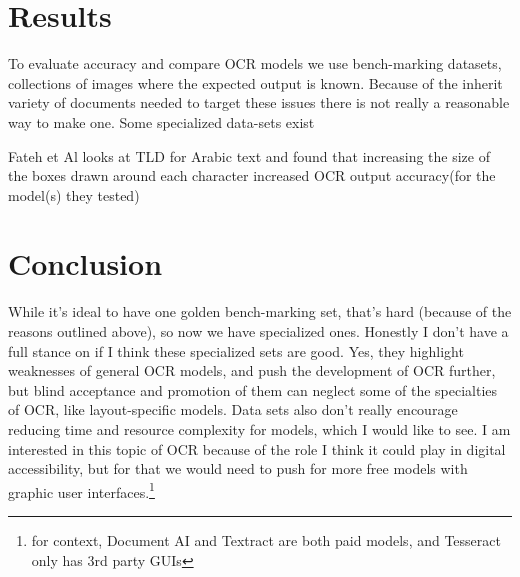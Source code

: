 \documentclass[sigplan,screen,nonacm]{acmart-tagged}
\begin{document}
\section{Results}
\label{sec:Results}

To evaluate accuracy and compare OCR models we use bench-marking datasets, collections of images where the expected output is known. Because of the inherit variety of documents needed to target these issues there is not really a reasonable way to make one. Some specialized data-sets exist \cite{Fateh:2024,Hegghamer:2022}

Fateh et Al\citep{Fateh:2024} looks at TLD for Arabic text and found that increasing the size of the boxes drawn around each character increased OCR output accuracy(for the model(s) they tested)

\section{Conclusion}
\label{sec:Conclusion}

While it's ideal to have one golden bench-marking set, that's hard (because of the reasons outlined above), so now we have specialized ones. 
Honestly I don't have a full stance on if I think these specialized sets are good. Yes, they highlight weaknesses of general OCR models, and push the development of OCR further, but blind acceptance and promotion of them can neglect some of the specialties of OCR, like layout-specific models. Data sets also don't really encourage reducing time and resource complexity for models, which I would like to see.
I am interested in this topic of OCR because of the role I think it could play in digital accessibility, but for that we would need to push for more free models with graphic user interfaces.\footnote{for context, Document AI and Textract are both paid models, and Tesseract only has 3rd party GUIs} 

\end{document}
